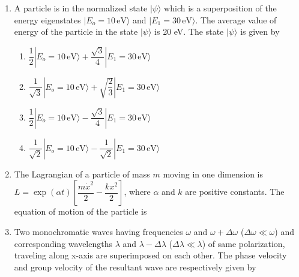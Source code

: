 \documentclass[14pt, a4paper]{extarticle}
\begin{document}
\begin{enumerate}[label=\textbf{Q. \arabic*}, start=21]
\item A particle is in the normalized state $|\psi\rangle$ which is a superposition of the energy eigenstates $|E_o=10\,\text{eV}\rangle$ and $|E_1=30\,\text{eV}\rangle$. The average value of energy of the particle in the state $|\psi\rangle$ is 20 eV. The state $|\psi\rangle$ is given by
\begin{enumerate}[label=(\Alph*)]
\item $\dfrac{1}{2}|E_o=10\,\text{eV}\rangle + \dfrac{\sqrt{3}}{4}|E_1=30\,\text{eV}\rangle$
\item $\dfrac{1}{\sqrt{3}}|E_o=10\,\text{eV}\rangle + \sqrt{\dfrac{2}{3}}|E_1=30\,\text{eV}\rangle$
\item $\dfrac{1}{2}|E_o=10\,\text{eV}\rangle - \dfrac{\sqrt{3}}{4}|E_1=30\,\text{eV}\rangle$
\item $\dfrac{1}{\sqrt{2}}|E_o=10\,\text{eV}\rangle - \dfrac{1}{\sqrt{2}}|E_1=30\,\text{eV}\rangle$
\end{enumerate}

\item The Lagrangian of a particle of mass $m$ moving in one dimension is $L = \exp(\alpha t) \left[ \dfrac{m\dot{x}^2}{2} - \dfrac{kx^2}{2} \right]$, where $\alpha$ and $k$ are positive constants. The equation of motion of the particle is
\begin{enumerate}[label=(\Alph*)]
\end{enumerate}

\item Two monochromatic waves having frequencies $\omega$ and $\omega + \Delta\omega$ ($\Delta\omega \ll \omega$) and corresponding wavelengths $\lambda$ and $\lambda - \Delta\lambda$ ($\Delta\lambda \ll \lambda$) of same polarization, traveling along x-axis are superimposed on each other. The phase velocity and group velocity of the resultant wave are respectively given by
\begin{enumerate}[label=(\Alph*)]
\end{enumerate}

\end{enumerate}
\end{document}
